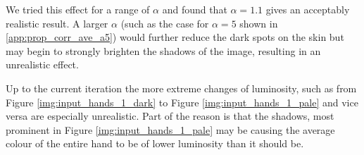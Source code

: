 We tried this effect for a range of $\alpha$ and found that $\alpha = 1.1$ gives an acceptably realistic result. A larger $\alpha$ (such as the case for $\alpha = 5$ shown in \ref{app:prop_corr_ave_a5}) would further reduce the dark spots on the skin but may begin to strongly brighten the shadows of the image, resulting in an unrealistic effect.

Up to the current iteration the more extreme changes of luminosity, such as from Figure \ref{img:input_hands_1_dark} to Figure \ref{img:input_hands_1_pale} and vice versa are especially unrealistic. Part of the reason is that the shadows, most prominent in Figure \ref{img:input_hands_1_pale} may be causing the average colour of the entire hand to be of lower luminosity than it should be. 